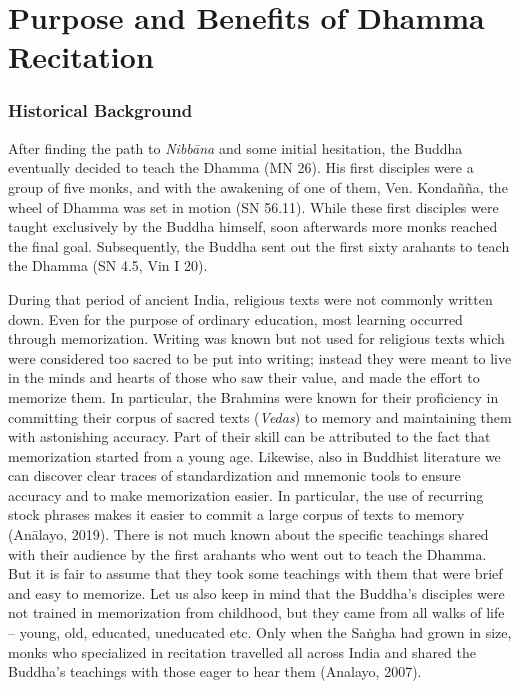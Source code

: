 

\chapter[Purpose and Benefits\\ of Dhamma Recitation]{Purpose and Benefits of Dhamma Recitation}
\label{purpose-and-benefits}

\subsection*{Historical Background}

After finding the path to \textit{Nibbāna} and some initial hesitation, the Buddha eventually decided to teach the Dhamma (MN 26). His first disciples were a group of five monks, and with the awakening of one of them, Ven. Kondañña, the wheel of Dhamma was set in motion (SN 56.11). While these first disciples were taught exclusively by the Buddha himself, soon afterwards more monks reached the final goal. Subsequently, the Buddha sent out the first sixty arahants to teach the Dhamma (SN 4.5, Vin I 20).

During that period of ancient India, religious texts were not commonly written down. Even for the purpose of ordinary education, most learning occurred through memorization. Writing was known but not used for religious texts which were considered too sacred to be put into writing; instead they were meant to live in the minds and hearts of those who saw their value, and made the effort to memorize them. In particular, the Brahmins were known for their proficiency in committing their corpus of sacred texts (\textit{Vedas}) to memory and maintaining them with astonishing accuracy. Part of their skill can be attributed to the fact that memorization started from a young age. Likewise, also in Buddhist literature we can discover clear traces of standardization and mnemonic tools to ensure accuracy and to make memorization easier. In particular, the use of recurring stock phrases makes it easier to commit a large corpus of texts to memory (Anālayo, 2019). There is not much known about the specific teachings shared with their audience by the first arahants who went out to teach the Dhamma. But it is fair to assume that they took some teachings with them that were brief and easy to memorize. Let us also keep in mind that the Buddha's disciples were not trained in memorization from childhood, but they came from all walks of life – young, old, educated, uneducated etc. Only when the Saṅgha had grown in size, monks who specialized in recitation travelled all across India and shared the Buddha's teachings with those eager to hear them (Analayo, 2007).

